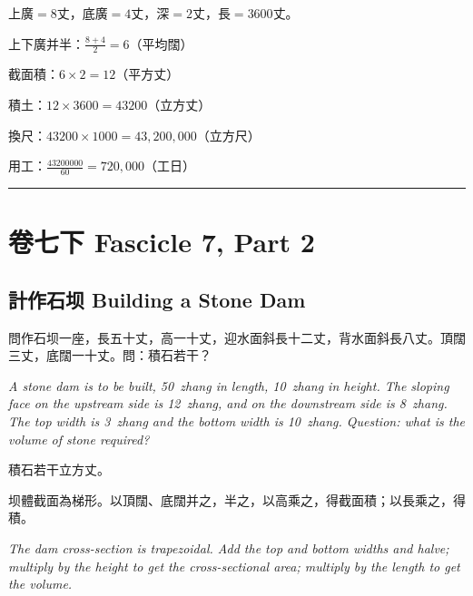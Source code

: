 \documentclass[11pt,a4paper]{article}
\newcommand{\longline}{\noindent\rule{\textwidth}{0.4pt}}
\begin{document}
\begin{working}
上廣$=8$丈，底廣$=4$丈，深$=2$丈，長$=3600$丈。

上下廣并半：$\displaystyle\frac{8+4}{2} = 6$（平均闊）

截面積：$6 \times 2 = 12$（平方丈）

積土：$12 \times 3600 = 43200$（立方丈）

換尺：$43200 \times 1000 = 43{,}200{,}000$（立方尺）

用工：$\displaystyle\frac{43200000}{60} = 720{,}000$（工日）
\end{working}

\vspace{0.5em}
\longline

\newpage
\section{卷七下 \quad Fascicle 7, Part 2}
\label{sec:fasc7b}

\begin{center}
\end{center}

\medskip

\subsection{計作石坝 \quad Building a Stone Dam}

\begin{problem}
問作石坝一座，長五十丈，高一十丈，迎水面斜長十二丈，背水面斜長八丈。頂闊三丈，底闊一十丈。問：積石若干？

\textit{A stone dam is to be built, 50~zhang in length, 10~zhang in height. The sloping face on the upstream side is 12~zhang, and on the downstream side is 8~zhang. The top width is 3~zhang and the bottom width is 10~zhang. Question: what is the volume of stone required?}
\end{problem}

\begin{answer}
積石若干立方丈。
\end{answer}

\begin{method}
坝體截面為梯形。以頂闊、底闊并之，半之，以高乘之，得截面積；以長乘之，得積。

\textit{The dam cross-section is trapezoidal. Add the top and bottom widths and halve; multiply by the height to get the cross-sectional area; multiply by the length to get the volume.}
\end{method}
\end{document}
